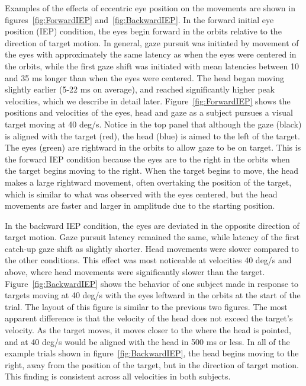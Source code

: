 \documentclass[12pt]{article}
\begin{document}
Examples of the effects of eccentric eye position on the movements are shown in figures~\ref{fig:ForwardIEP} and~\ref{fig:BackwardIEP}. In the forward initial eye position (IEP) condition, the eyes begin forward in the orbits relative to the direction of target motion. In general, gaze pursuit was initiated by movement of the eyes with approximately the same latency as when the eyes were centered in the orbits, while the first gaze shift was initiated with mean latencies between 10 and 35 ms longer than when the eyes were centered. The head began moving slightly earlier (5-22 ms on average), and reached significantly higher peak velocities, which we describe in detail later. Figure~\ref{fig:ForwardIEP} shows the positions and velocities of the eyes, head and gaze as a subject pursues a visual target moving at 40 deg/s. Notice  in the top panel that although the gaze (black) is aligned with the target (red), the head (blue) is aimed to the left of the target. The eyes (green) are rightward in the orbits to allow gaze to be on target. This is the forward IEP condition because the eyes are to the right in the orbits when the target begins moving to the right. When the target begins to move, the head makes a large rightward movement, often overtaking the position of the target, which is similar to what was observed with the eyes centered, but the head movements are faster and larger in amplitude due to the starting position.  

In the backward IEP condition, the eyes are deviated in the opposite direction of target motion.  Gaze pursuit latency remained the same, while latency of the first catch-up gaze shift as slightly shorter. Head movements were slower compared to the other conditions. This effect was most noticeable at velocities 40 deg/s and above, where head movements were significantly slower than the target. Figure~\ref{fig:BackwardIEP} shows the behavior of one subject made in response to targets moving at 40 deg/s with the eyes leftward in the orbits at the start of the trial. The layout of this figure is similar to the previous two figures. The most apparent difference is that the velocity of the head does not exceed the target’s velocity. As the target moves, it moves closer to the where the head is pointed, and at 40 deg/s would be aligned with the head in 500 ms or less. In all of the example trials shown in figure~\ref{fig:BackwardIEP}, the head begins moving to the right, away from the position of the target, but in the direction of target motion. This finding is consistent across all velocities in both subjects. 
\end{document}
